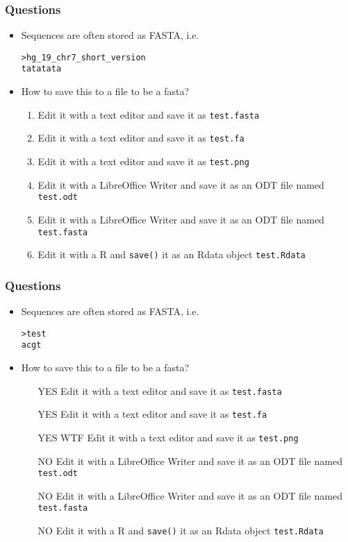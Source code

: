 \documentclass{beamer}
\begin{document}
\begin{frame}[fragile]
  \frametitle{Questions}
  \begin{itemize}
  \item Sequences are often stored as FASTA, i.e.
\begin{verbatim}
>hg_19_chr7_short_version
tatatata
\end{verbatim}
  \item How to save this to a file to be a fasta?
    \begin{enumerate}
    \item Edit it with a text editor and save it as \texttt{test.fasta}
    \item Edit it with a text editor and save it as \texttt{test.fa}
    \item Edit it with a text editor and save it as \texttt{test.png}
    \item Edit it with a LibreOffice Writer and save it as an ODT file named \texttt{test.odt}
    \item Edit it with a LibreOffice Writer and save it as an ODT file named \texttt{test.fasta}
    \item Edit it with a R and \texttt{save()} it as an Rdata object \texttt{test.Rdata}
    \end{enumerate}
  \end{itemize}
\end{frame}


\begin{frame}[fragile]
  \frametitle{Questions}
  \begin{itemize}
  \item Sequences are often stored as FASTA, i.e.
\begin{verbatim}
>test
acgt
\end{verbatim}
  \item How to save this to a file to be a fasta?
    \begin{enumerate}
    \item[YES] Edit it with a text editor and save it as \texttt{test.fasta} 
    \item[YES] Edit it with a text editor and save it as \texttt{test.fa}
    \item[YES WTF] Edit it with a text editor and save it as \texttt{test.png}
    \item[NO] Edit it with a LibreOffice Writer and save it as an ODT file named \texttt{test.odt}
    \item[NO] Edit it with a LibreOffice Writer and save it as an ODT file named \texttt{test.fasta}
    \item[NO] Edit it with a R and \texttt{save()} it as an Rdata object \texttt{test.Rdata}
    \end{enumerate}
  \end{itemize}
\end{frame}
\end{document}

